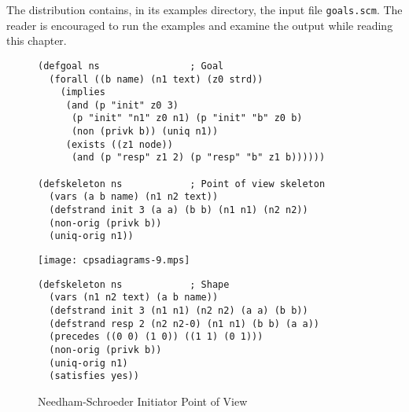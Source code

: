 
The {\cpsa} distribution contains, in its examples directory, the
input file \texttt{goals.scm}.  The reader is encouraged to run the
examples and examine the output while reading this chapter.

\iffalse 
\begin{figure}
\begin{center}
\texttt{[image: cpsadiagrams-0.mps]}\hfil
\texttt{[image: cpsadiagrams-1.mps]}\\
\end{center}
\begin{center}
\begin{minipage}{3in}
\begin{verbatim}
(defprotocol ns basic
  (defrole init
    (vars (a b name) (n1 n2 text))
    (trace
     (send (enc n1 a (pubk b)))
     (recv (enc n1 n2 (pubk a)))
     (send (enc n2 (pubk b)))))
  (defrole resp
    (vars (b a name) (n2 n1 text))
    (trace
     (recv (enc n1 a (pubk b)))
     (send (enc n1 n2 (pubk a)))
     (recv (enc n2 (pubk b))))))
\end{verbatim}
\end{minipage}
\end{center}
\caption{Needham-Schroeder Initiator and Responder Roles}
\label{fig:ns roles 2}
\end{figure}
\fi 
\begin{figure}
\begin{verbatim}
(defgoal ns                ; Goal
  (forall ((b name) (n1 text) (z0 strd))
    (implies
     (and (p "init" z0 3)
      (p "init" "n1" z0 n1) (p "init" "b" z0 b)
      (non (privk b)) (uniq n1))
     (exists ((z1 node))
      (and (p "resp" z1 2) (p "resp" "b" z1 b))))))

(defskeleton ns            ; Point of view skeleton
  (vars (a b name) (n1 n2 text))
  (defstrand init 3 (a a) (b b) (n1 n1) (n2 n2))
  (non-orig (privk b))
  (uniq-orig n1))
\end{verbatim}
{\centering
\texttt{[image: cpsadiagrams-9.mps]}}
\begin{verbatim}
(defskeleton ns            ; Shape
  (vars (n1 n2 text) (a b name))
  (defstrand init 3 (n1 n1) (n2 n2) (a a) (b b))
  (defstrand resp 2 (n2 n2-0) (n1 n1) (b b) (a a))
  (precedes ((0 0) (1 0)) ((1 1) (0 1)))
  (non-orig (privk b))
  (uniq-orig n1)
  (satisfies yes))
\end{verbatim}
\caption{Needham-Schroeder Initiator Point of View}
\label{fig:ns init}
\end{figure}

